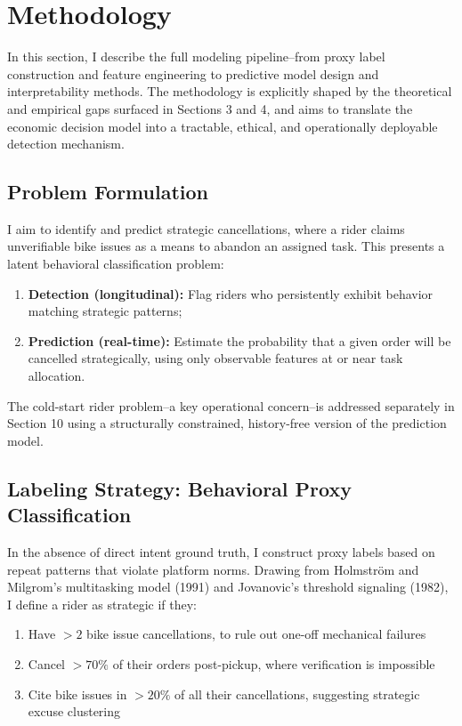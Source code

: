 \section{Methodology}

In this section, I describe the full modeling pipeline--from proxy label construction and feature engineering to predictive model design and interpretability methods. The methodology is explicitly shaped by the theoretical and empirical gaps surfaced in Sections 3 and 4, and aims to translate the economic decision model into a tractable, ethical, and operationally deployable detection mechanism.

\subsection{Problem Formulation}

I aim to identify and predict strategic cancellations, where a rider claims unverifiable bike issues as a means to abandon an assigned task. This presents a latent behavioral classification problem:

\begin{enumerate}
    \item \textbf{Detection (longitudinal):} Flag riders who persistently exhibit behavior matching strategic patterns;
    \item \textbf{Prediction (real-time):} Estimate the probability that a given order will be cancelled strategically, using only observable features at or near task allocation.
\end{enumerate}

The cold-start rider problem--a key operational concern--is addressed separately in Section 10 using a structurally constrained, history-free version of the prediction model.

\subsection{Labeling Strategy: Behavioral Proxy Classification}

In the absence of direct intent ground truth, I construct proxy labels based on repeat patterns that violate platform norms. Drawing from Holmström and Milgrom's multitasking model (1991) and Jovanovic's threshold signaling (1982), I define a rider as strategic if they:

\begin{enumerate}
    \item Have $>2$ bike issue cancellations, to rule out one-off mechanical failures
    \item Cancel $>70\%$ of their orders post-pickup, where verification is impossible
    \item Cite bike issues in $>20\%$ of all their cancellations, suggesting strategic excuse clustering
\end{enumerate}

